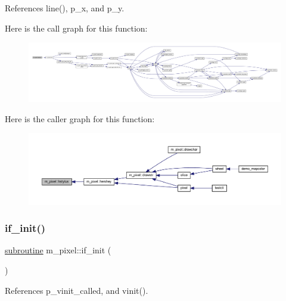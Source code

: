 References line(), p\+\_\+x, and p\+\_\+y.

Here is the call graph for this function\+:
\nopagebreak
\begin{figure}[H]
\begin{center}
\leavevmode
\includegraphics[width=350pt]{namespacem__pixel_a15c5daa9ab477991c2c6e17741cf40eb_cgraph}
\end{center}
\end{figure}
Here is the caller graph for this function\+:
\nopagebreak
\begin{figure}[H]
\begin{center}
\leavevmode
\includegraphics[width=350pt]{namespacem__pixel_a15c5daa9ab477991c2c6e17741cf40eb_icgraph}
\end{center}
\end{figure}
\mbox{\label{namespacem__pixel_a6c23c2779e54da4ac7505cfb816cc2b1}} 
\subsubsection{\texorpdfstring{if\+\_\+init()}{if\_init()}}
{\footnotesize\ttfamily \hyperlink{M__stopwatch_83_8txt_acfbcff50169d691ff02d4a123ed70482}{subroutine} m\+\_\+pixel\+::if\+\_\+init (\begin{DoxyParamCaption}{ }\end{DoxyParamCaption})\hspace{0.3cm}{\ttfamily [private]}}



References p\+\_\+vinit\+\_\+called, and vinit().

